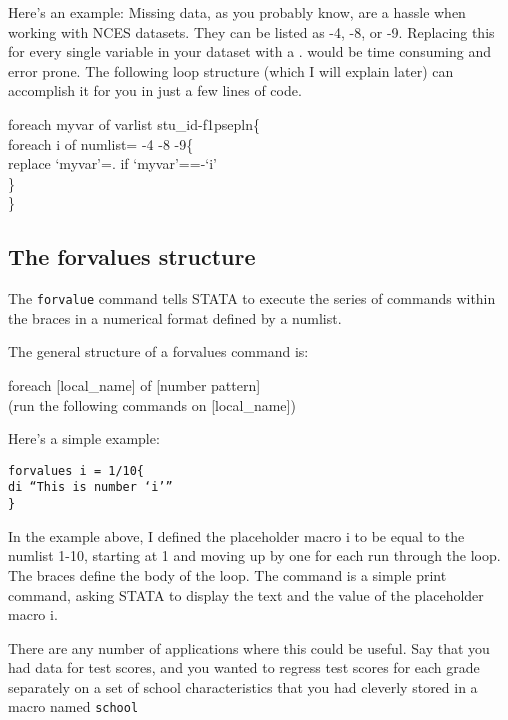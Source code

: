 \documentclass[10pt]{article}
\begin{document}
Here's an example: Missing data, as you probably know, are a hassle
when working with NCES datasets. They can be listed as -4, -8, or -9.
Replacing this for every single variable in your dataset with a .
would be time consuming and error prone. The following loop structure
(which I will explain later) can accomplish it for you in just a few
lines of code.

\begin{texttt} {foreach myvar of varlist stu\_id-f1psepln\{ \\
        foreach i of numlist= -4 -8 -9\{ \\
        replace `myvar'=. if `myvar'==-`i' \\
        \} \\
        \} \\ }
\end{texttt}        

\subsection{The forvalues structure}

The \texttt{forvalue} command tells STATA to execute the series of
commands within the braces in a numerical format defined by a
numlist. 

The general structure of a forvalues command is:

\begin{texttt}
  foreach [local\_name] of [number pattern] {\\
    (run the following commands on [local\_name]) \\
    }
\end{texttt}

Here's a simple example: 

\texttt{forvalues i = 1/10\{\\
        di ``This is number `i'''  \\
        \} }

In the example above, I defined the placeholder macro i to be equal to
the numlist 1-10, starting at 1 and moving up by one for each run
through the loop. The braces define the body of the loop. The command
is a simple print command, asking STATA to display the text and the
value of the placeholder macro i. 

There are any number of applications where this could be useful. Say
that you had data for test scores, and you wanted to regress test
scores for each grade separately on a set of school characteristics
that you had cleverly stored in a macro named \texttt{school}
\end{document}
